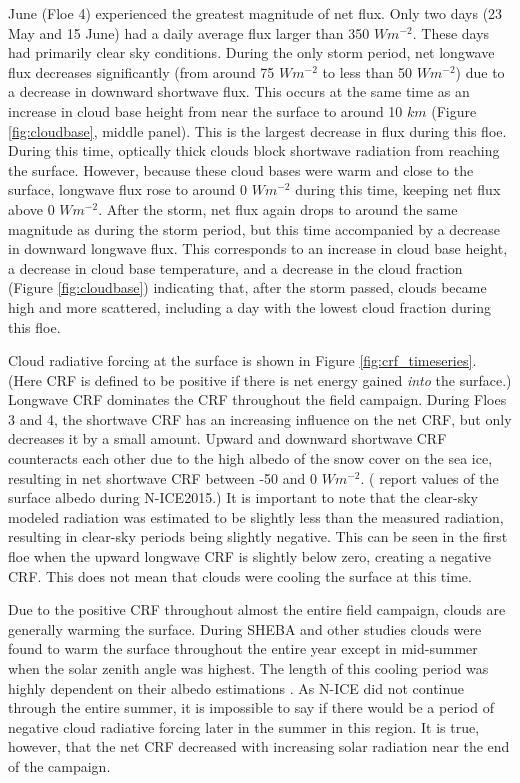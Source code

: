 June (Floe 4) experienced the greatest magnitude of net flux. Only two days (23 May and 15 June) had a daily average flux larger than 350 $Wm^{-2}$. These days had primarily clear sky conditions. During the only storm period, net longwave flux decreases significantly (from around 75 $Wm^{-2}$ to less than 50 $Wm^{-2}$) due to a decrease in downward shortwave flux. This occurs at the same time as an increase in cloud base height from near the surface to around 10 $km$ (Figure \ref{fig:cloudbase}, middle panel). This is the largest decrease in flux during this floe. During this time, optically thick clouds block shortwave radiation from reaching the surface. However, because these cloud bases were warm and close to the surface, longwave flux rose to around 0 $Wm^{-2}$ during this time, keeping net flux above 0 $Wm^{-2}$. After the storm, net flux again drops to around the same magnitude as during the storm period, but this time accompanied by a decrease in downward longwave flux. This corresponds to an increase in cloud base height, a decrease in cloud base temperature, and a decrease in the cloud fraction (Figure \ref{fig:cloudbase}) indicating that, after the storm passed, clouds became high and more scattered, including a day with the lowest cloud fraction during this floe. 

Cloud radiative forcing at the surface is shown in Figure \ref{fig:crf_timeseries}. (Here CRF is defined to be positive if there is net energy gained \emph{into} the surface.) Longwave CRF dominates the CRF throughout the field campaign. During Floes 3 and 4, the shortwave CRF has an increasing influence on the net CRF, but only decreases it by a small amount. Upward and downward shortwave CRF counteracts each other due to the high albedo of the snow cover on the sea ice, resulting in net shortwave CRF between -50 and 0 $Wm^{-2}$. (\citet{walden:2017} report values of the surface albedo during N-ICE2015.) It is important to note that the clear-sky modeled radiation was estimated to be slightly less than the measured radiation, resulting in clear-sky periods being slightly negative. This can be seen in the first floe when the upward longwave CRF is slightly below zero, creating a negative CRF. This does not mean that clouds were cooling the surface at this time. 

Due to the positive CRF throughout almost the entire field campaign, clouds are generally warming the surface. During SHEBA and other studies \citep{schweiger:2004, cogley:1984, walsh:1998, curry:1996} clouds were found to warm the surface throughout the entire year except in mid-summer when the solar zenith angle was highest. The length of this cooling period was highly dependent on their albedo estimations \citep{intrieri:2002}. As N-ICE did not continue through the entire summer, it is impossible to say if there would be a period of negative cloud radiative forcing later in the summer in this region. It is true, however, that the net CRF decreased with increasing solar radiation near the end of the campaign.

